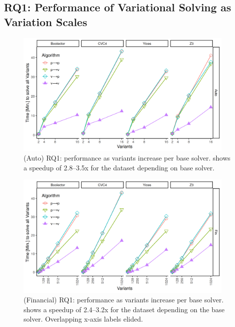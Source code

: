 \subsection{RQ1: Performance of Variational Solving as Variation Scales}

\begin{figure}
  \centering
  \includegraphics[width=0.95\textwidth]{Plots/RQ1_Auto}
  \caption{(Auto) RQ1: performance as variants increase per base solver. \vTov{}
    shows a speedup of 2.8--3.5x for the \auto{} dataset depending on base
    solver.}%
  \label{res:rq1:auto}
\end{figure}
%
\begin{figure}[h]
  \centering
  \includegraphics[width=0.95\textwidth]{Plots/RQ1_Fin}
  \caption{(Financial) RQ1: performance as variants increase per base solver. \vTov{}
    shows a speedup of 2.4--3.2x for the \fin{} dataset depending on the base
    solver. Overlapping x-axis labels elided.}%
  \label{res:rq1:fin}
\end{figure}

